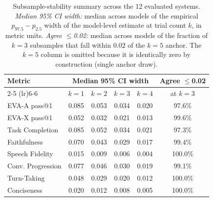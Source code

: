 \begin{table}[h]
\centering\small
\caption{Subsample-stability summary across the 12 evaluated systems.
\emph{Median 95\% CI width:} median across models of the empirical
$p_{97.5}{-}p_{2.5}$ width of the model-level estimate at trial count $k$,
in metric units. \emph{Agree $\le$0.02:} median across models of the
fraction of $k{=}3$ subsamples that fall within $0.02$ of the $k{=}5$
anchor. The $k{=}5$ column is omitted because it is identically zero by
construction (single anchor draw).}
\begin{tabular}{lccccc}
\toprule
\textbf{Metric} & \multicolumn{4}{c}{\textbf{Median 95\% CI width}} & \textbf{Agree $\le$0.02} \\
\cmidrule(lr){2-5} \cmidrule(lr){6-6}
 & $k{=}1$ & $k{=}2$ & $k{=}3$ & $k{=}4$ & at $k{=}3$ \\
\midrule
  EVA-A pass@1 & 0.085 & 0.053 & 0.034 & 0.020 & 97.6\% \\
  EVA-X pass@1 & 0.052 & 0.032 & 0.021 & 0.013 & 99.6\% \\
  Task Completion & 0.085 & 0.052 & 0.034 & 0.021 & 97.3\% \\
  Faithfulness & 0.070 & 0.043 & 0.029 & 0.017 & 99.4\% \\
  Speech Fidelity & 0.015 & 0.009 & 0.006 & 0.004 & 100.0\% \\
  Conv. Progression & 0.077 & 0.046 & 0.030 & 0.019 & 99.1\% \\
  Turn-Taking & 0.048 & 0.029 & 0.020 & 0.012 & 100.0\% \\
  Conciseness & 0.020 & 0.012 & 0.008 & 0.005 & 100.0\% \\
\bottomrule
\end{tabular}
\label{tab:trial_count_summary}
\end{table}